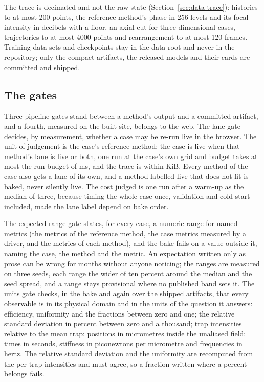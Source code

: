 The trace is decimated and not the raw state (Section~\ref{sec:data-trace}): histories to at most 200 points, the reference method's phase in 256 levels and its focal intensity in decibels with a floor, an axial cut for three-dimensional cases, trajectories to at most 4000 points and rearrangement to at most 120 frames. Training data sets and checkpoints stay in the data root and never in the repository; only the compact artifacts, the released models and their cards are committed and shipped.

\subsection{The gates}\label{sec:arch-gates}

Three pipeline gates stand between a method's output and a committed artifact, and a fourth, measured on the built site, belongs to the web. The lane gate decides, by measurement, whether a case may be re-run live in the browser. The unit of judgement is the case's reference method; the case is live when that method's lane is live or both, one run at the case's own grid and budget takes at most the run budget of \liveBudgetMs{} ms, and the trace is within \liveTraceKiB{} KiB. Every method of the case also gets a lane of its own, and a method labelled live that does not fit is baked, never silently live. The cost judged is one run after a warm-up as the median of three, because timing the whole case once, validation and cold start included, made the lane label depend on bake order.

The expected-range gate states, for every case, a numeric range for named metrics (the metrics of the reference method, the case metrics measured by a driver, and the metrics of each method), and the bake fails on a value outside it, naming the case, the method and the metric. An expectation written only as prose can be wrong for months without anyone noticing; the ranges are measured on three seeds, each range the wider of ten percent around the median and the seed spread, and a range stays provisional where no published band sets it. The units gate checks, in the bake and again over the shipped artifacts, that every observable is in its physical domain and in the units of the question it answers: efficiency, uniformity and the fractions between zero and one; the relative standard deviation in percent between zero and a thousand; trap intensities relative to the mean trap; positions in micrometres inside the unaliased field; times in seconds, stiffness in piconewtons per micrometre and frequencies in hertz. The relative standard deviation and the uniformity are recomputed from the per-trap intensities and must agree, so a fraction written where a percent belongs fails.

